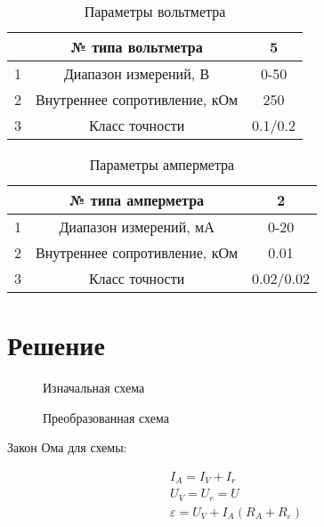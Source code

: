 \documentclass[a4paper,14pt]{extarticle}
\begin{document}
\begin{table}[ht]
  \centering
  \begin{tabular}{|c|c|c|}
   \hline
     & № типа вольтметра & 5 \\
   \hline
   1 & Диапазон измерений, В & 0-50 \\
   \hline
   2 & Внутреннее сопротивление, кОм & 250 \\
   \hline
   3 & Класс точности & 0.1/0.2 \\
   \hline
  \end{tabular}
  \caption{Параметры вольтметра}
  \label{tableref2}
\end{table}

\begin{table}[ht]
  \centering
  \begin{tabular}{|c|c|c|}
   \hline
     & № типа амперметра & 2 \\
   \hline
   1 & Диапазон измерений, мА & 0-20 \\
   \hline
   2 & Внутреннее сопротивление, кОм & 0.01 \\
   \hline
   3 & Класс точности & 0.02/0.02 \\
   \hline
  \end{tabular}
  \caption{Параметры амперметра}
  \label{tableref3}
\end{table}

\section{Решение}

\begin{figure}[H]
 \centering
  
  \caption{Изначальная схема}
  \label{pictureref1}
\end{figure}


\begin{figure}[H]
 \centering
  
  \caption{Преобразованная схема}
  \label{pictureref2}
\end{figure}

Закон Ома для схемы:

\begin{align}
  &I_A = I_V + I_r \\
  &U_V = U_r = U \\
  &\varepsilon = U_V + I_A (R_A + R_{\varepsilon})
\end{align}
\end{document}
